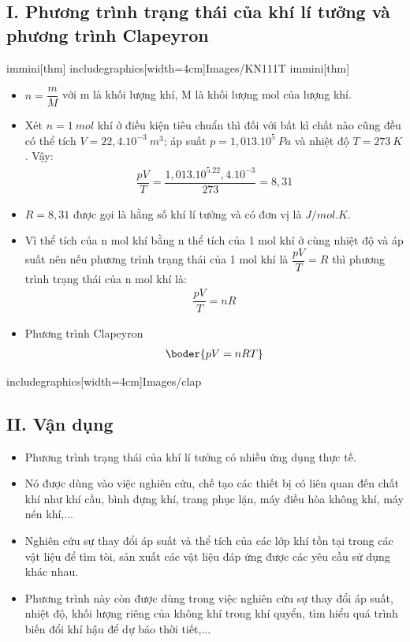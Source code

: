 \subsection*{I. Phương trình trạng thái của khí lí tưởng và phương trình Clapeyron}
immini[thm]{
}
{includegraphics[width=4cm]{Images/KN111T}}
immini[thm]{\begin{itemize}
	\item $n=\dfrac{m}{M}$ với m là khối lượng khí, M là khối lượng mol của lượng khí.
	\item Xét $n=1\ mol$ khí ở điều kiện tiêu chuẩn thì đối với bất kì chất nào cũng đều có thể tích $V=22,4.10^{-3}\ m^3$; áp suất $p=1,013.10^5\ Pa$ và nhiệt độ $T=273\ K$. Vậy:
	\begin{align*}
	\dfrac{pV}{T}=\dfrac{1,013.10^5.22,4.10^{-3}}{273}=8,31	
	\end{align*}
	\item $R=8,31$ được gọi là hằng số khí lí tưởng và có đơn vị là $J/mol.K$.
	\item Vì thể tích của n mol khí bằng n thể tích của 1 mol khí ở cùng nhiệt độ và áp suất nên nếu phương trình trạng thái của 1 mol khí là $\dfrac{pV}{T}=R$ thì phương trình trạng thái của n mol khí là: 
	 \begin{align*}
	 \dfrac{pV}{T}=nR
	 \end{align*}
	\item Phương trình Clapeyron
	\begin{align*}
		\boder{pV=nRT}
	\end{align*}
\end{itemize}}
{includegraphics[width=4cm]{Images/clap}}



\subsection*{II. Vận dụng}
\begin{itemize}
	\item Phương trình trạng thái của khí lí tưởng có nhiều ứng dụng thực tế. 
	\item Nó được dùng vào việc nghiên cứu, chế tạo các thiết bị có liên quan đến chất khí như khí cầu, bình đựng khí, trang phục lặn, máy điều hòa không khí, máy nén khí,...
	\item Nghiên cứu sự thay đổi áp suất và thể tích của các lớp khí tồn tại trong các vật liệu để tìm tòi, sản xuất các vật liệu đáp ứng được các yêu cầu sử dụng khác nhau.
	\item Phương trình này còn được dùng trong việc nghiên cứu sự thay đổi áp suất, nhiệt độ, khối lượng riêng của không khí trong khí quyển, tìm hiểu quá trình biến đổi khí hậu để dự báo thời tiết,...
\end{itemize}